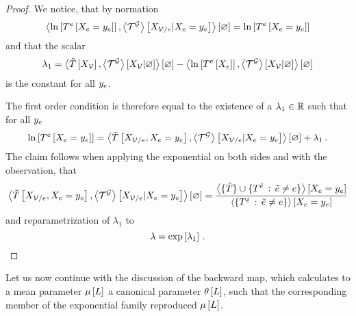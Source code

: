 \begin{proof}
    We notice, that by normation
    \[ \left\langle \ln \left[ T^{e}\left[X_{e}=y_{e}\right] \right], \left\langle \mathcal{T}^{\mathcal{G}}\right\rangle \left[ X_{\mathcal{V}/e} | X_{e}=y_{e} \right]\right\rangle \left[ \varnothing \right] =  \ln \left[ T^{e}\left[X_{e}=y_{e}\right] \right] \]
    and that the scalar
    \[ \lambda_1 = \left\langle \tilde{T}\left[X_{\mathcal{V}}\right],\left\langle \mathcal{T}^{\mathcal{G}}\right\rangle \left[ X_{\mathcal{V}} | \varnothing \right]\right\rangle \left[ \varnothing \right]
    - \left\langle \ln \left[ T^{e}\left[X_{e}\right] \right],\left\langle \mathcal{T}^{\mathcal{G}}\right\rangle \left[ X_{\mathcal{V}} | \varnothing \right]\right\rangle \left[ \varnothing \right]    \]
    is the constant for all $y_{e}$.

    The first order condition is therefore equal to the existence of a $\lambda_1\in\mathbb{R}$ such that for all $y_{e}$
    \begin{align*}
        \ln \left[ T^{e}\left[X_{e}=y_{e}\right] \right]
        =    \left\langle \tilde{T}\left[X_{\mathcal{V}/e},X_{e}=y_{e}\right],
            \left\langle \mathcal{T}^{\mathcal{G}}\right\rangle \left[ X_{\mathcal{V}/e} | X_{e}=y_{e} \right]\right\rangle \left[ \varnothing \right] + \lambda_1 \, .
    \end{align*}
    The claim follows when applying the exponential on both sides and with the observation, that
    \begin{align*}
        \left\langle \tilde{T}\left[X_{\mathcal{V}/e},X_{e}=y_{e}\right],
            \left\langle \mathcal{T}^{\mathcal{G}}\right\rangle \left[ X_{\mathcal{V}/e} | X_{e}=y_{e} \right]\right\rangle \left[ \varnothing \right]
        =
        \frac{\left\langle \{\tilde{T}\}\cup\{T^{\tilde{e}} \, : \, \tilde{e}\neq e\}\right\rangle \left[ X_{e}=y_{e} \right] }{
            \left\langle \{T^{\tilde{e}} \, : \, \tilde{e}\neq e\}\right\rangle \left[ X_{e}=y_{e} \right]
        }
    \end{align*}
    and reparametrization of $\lambda_1$ to
    \[ \lambda = \mathrm{exp}\left[\lambda_1\right] \, . \]
\end{proof}



Let us now continue with the discussion of the backward map, which calculates to a mean parameter $\mu\left[L\right]$ a canonical parameter $\theta\left[L\right]$, such that the corresponding member of the exponential family reproduced $\mu\left[L\right]$.


